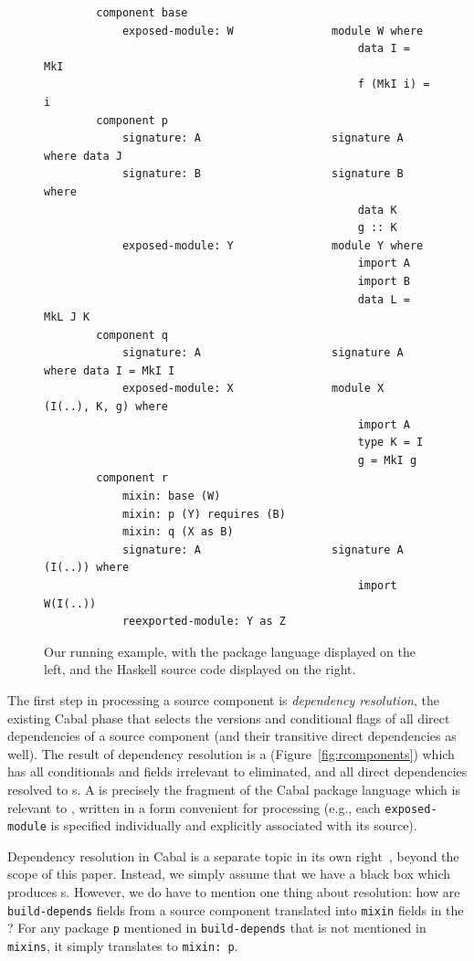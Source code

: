 \begin{figure}
\begin{verbatim}
        component base
            exposed-module: W               module W where
                                                data I = MkI
                                                f (MkI i) = i
        component p
            signature: A                    signature A where data J
            signature: B                    signature B where
                                                data K
                                                g :: K
            exposed-module: Y               module Y where
                                                import A
                                                import B
                                                data L = MkL J K
        component q
            signature: A                    signature A where data I = MkI I
            exposed-module: X               module X (I(..), K, g) where
                                                import A
                                                type K = I
                                                g = MkI g
        component r
            mixin: base (W)
            mixin: p (Y) requires (B)
            mixin: q (X as B)
            signature: A                    signature A (I(..)) where
                                                import W(I(..))
            reexported-module: Y as Z
\end{verbatim}
  \caption{Our running example, with the package language displayed
  on the left, and the Haskell source code displayed on the right.}\label{fig:resolved-example}
\end{figure}

The first step in
processing a source component is \emph{dependency resolution},
the existing Cabal phase that
selects the versions and conditional flags of all direct dependencies of
a source component (and their transitive direct dependencies as well).
The result of dependency resolution is a \emph{\ccomp}
(Figure~\ref{fig:rcomponents}) which has all conditionals and fields
irrelevant to \Backpack{} eliminated, and all direct dependencies
resolved to \cid{}s.  A \ccomp{} is precisely the fragment of the
Cabal package language which is relevant to \Backpack{}, written in a
form convenient for processing (e.g., each \verb|exposed-module| is
specified individually and explicitly associated with its source).

Dependency resolution in Cabal is a separate topic in its own
right~\cite{well-typed-solver, well-typed-qualified}, beyond the scope of this paper.
Instead, we simply assume that we have a black box which
produces \ccomp{}s.  However, we do have to mention one thing about resolution:
how are \verb|build-depends| fields from
a source component translated into \verb|mixin| fields in the
\ccomp{}?  For any package \verb|p| mentioned in \verb|build-depends|
that is not mentioned in \verb|mixins|, it simply translates to
\verb|mixin: p|.

